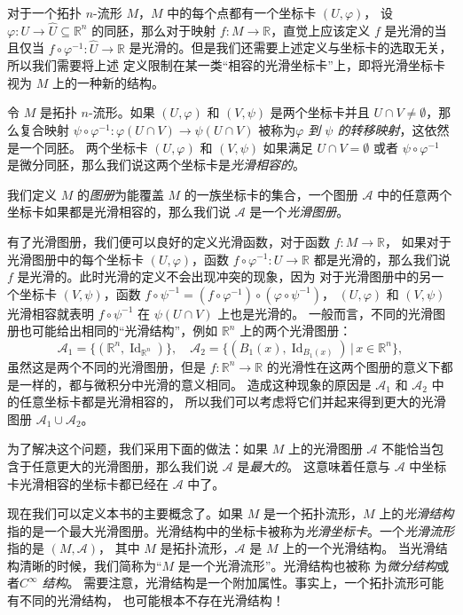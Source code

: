 \documentclass[fontset=none]{Notes}
\DeclareMathOperator\Id{Id}
\begin{document}
对于一个拓扑 $n$-流形 $M$，$M$ 中的每个点都有一个坐标卡 $(U,\varphi)$，
设 $\varphi:U\to\hat U\subseteq\mathbb{R}^n$ 的同胚，那么对于映射
$f:M\to\mathbb{R}$，直觉上应该定义 $f$ 是光滑的当且仅当 $f\circ\varphi^{-1}:\hat U\to\mathbb{R}$
是光滑的。但是我们还需要上述定义与坐标卡的选取无关，所以我们需要将上述
定义限制在某一类“相容的光滑坐标卡”上，即将光滑坐标卡视为 $M$ 上的一种新的结构。

令 $M$ 是拓扑 $n$-流形。如果 $(U,\varphi)$ 和 $(V,\psi)$ 是两个坐标卡并且
$U\cap V\neq\emptyset$，那么复合映射 $\psi\circ\varphi^{-1}:\varphi(U\cap V)\to\psi(U\cap V)$
被称为\emph{$\varphi$ 到 $\psi$ 的转移映射}，这依然是一个同胚。
两个坐标卡 $(U,\varphi)$ 和 $(V,\psi)$ 如果满足 $U\cap V=\emptyset$ 或者
$\psi\circ\varphi^{-1}$ 是微分同胚，那么我们说这两个坐标卡是\emph{光滑相容的}。

我们定义 $M$ 的\emph{图册}为能覆盖 $M$ 的一族坐标卡的集合，一个图册 $\mathcal{A}$
中的任意两个坐标卡如果都是光滑相容的，那么我们说 $\mathcal{A}$ 是一个\emph{光滑图册}。

有了光滑图册，我们便可以良好的定义光滑函数，对于函数 $f:M\to\mathbb{R}$，
如果对于光滑图册中的每个坐标卡 $(U,\varphi)$，函数 $f\circ\varphi^{-1}:U\to\mathbb{R}$
都是光滑的，那么我们说 $f$ 是光滑的。此时光滑的定义不会出现冲突的现象，因为
对于光滑图册中的另一个坐标卡 $(V,\psi)$，函数 $f\circ\psi^{-1}=(f\circ\varphi^{-1})\circ(\varphi\circ\psi^{-1})$，
$(U,\varphi)$ 和 $(V,\psi)$ 光滑相容就表明 $f\circ\psi^{-1}$ 在 $\psi(U\cap V)$ 上也是光滑的。
一般而言，不同的光滑图册也可能给出相同的“光滑结构”，例如 $\mathbb{R}^n$ 上的两个光滑图册：
\[
  \mathcal{A}_1=\{(\mathbb{R}^n,\Id_{\mathbb{R}^n})\},\quad
  \mathcal{A}_2=\{(B_1(x),\Id_{B_1(x)})\,|\, x\in\mathbb{R}^n\},
\]
虽然这是两个不同的光滑图册，但是 $f:\mathbb{R}^n\to\mathbb{R}$
的光滑性在这两个图册的意义下都是一样的，都与微积分中光滑的意义相同。
造成这种现象的原因是 $\mathcal{A}_1$ 和 $\mathcal{A}_2$ 中的任意坐标卡都是光滑相容的，
所以我们可以考虑将它们并起来得到更大的光滑图册 $\mathcal{A}_1\cup\mathcal{A}_2$。

为了解决这个问题，我们采用下面的做法：如果 $M$ 上的光滑图册 $\mathcal{A}$
不能恰当包含于任意更大的光滑图册，那么我们说 $\mathcal{A}$ 是\emph{最大的}。
这意味着任意与 $\mathcal{A}$ 中坐标卡光滑相容的坐标卡都已经在 $\mathcal{A}$
中了。

现在我们可以定义本书的主要概念了。如果 $M$ 是一个拓扑流形，$M$ 上的\emph{光滑结构}
指的是一个最大光滑图册。光滑结构中的坐标卡被称为\emph{光滑坐标卡}。一个\emph{光滑流形}指的是 $(M,\mathcal{A})$，
其中 $M$ 是拓扑流形，$\mathcal{A}$ 是 $M$ 上的一个光滑结构。
当光滑结构清晰的时候，我们简称为“$M$ 是一个光滑流形”。光滑结构也被称
为\emph{微分结构}或者\emph{$C^\infty$ 结构}。
需要注意，光滑结构是一个附加属性。事实上，一个拓扑流形可能有不同的光滑结构，
也可能根本不存在光滑结构！
\end{document}

